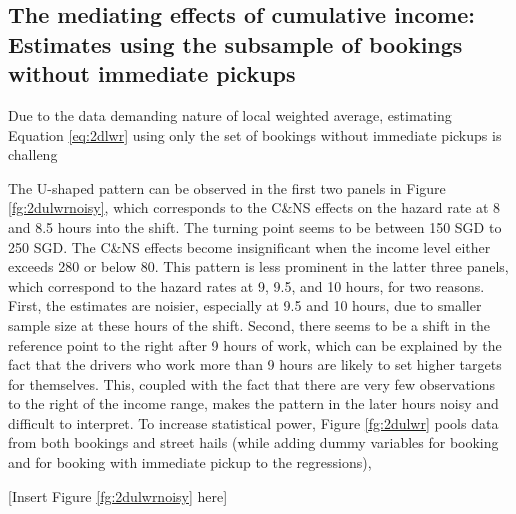 \documentclass[reviewmode,AEJ]{AEA}
\begin{document}
\begin{appendices}
\begin{table}
\end{table}



\section{The mediating effects of cumulative income: Estimates using the subsample of bookings without immediate pickups}
Due to the data demanding nature of local weighted average, estimating Equation \eqref{eq:2dlwr} using only the set of bookings without immediate pickups is challeng

The U-shaped pattern can be observed in the first two panels in Figure \ref{fg:2dulwrnoisy}, which corresponds to the C\&NS effects on the hazard rate at 8 and 8.5 hours into the shift. The turning point seems to be between 150 SGD to 250 SGD. The C\&NS effects become insignificant when the income level either exceeds 280 or below 80. This pattern is less prominent in the latter three panels, which correspond to the hazard rates at 9, 9.5, and 10 hours, for two reasons. First, the estimates are noisier, especially at 9.5 and 10 hours, due to smaller sample size at these hours of the shift. Second, there seems to be a shift in the reference point  to the right after 9 hours of work, which can be explained by the fact that the drivers who work more than 9 hours are likely to set higher targets for themselves. This, coupled with the fact that there are very few observations to the right of the income range, makes the pattern in the later hours noisy and difficult to interpret. To increase statistical power, Figure \ref{fg:2dulwr} pools data from both bookings and street hails (while adding dummy variables for booking and for booking with immediate pickup to the regressions), 

\begin{center}
	[Insert Figure \ref{fg:2dulwrnoisy} here]
\end{center}





\end{appendices}
\end{document}

